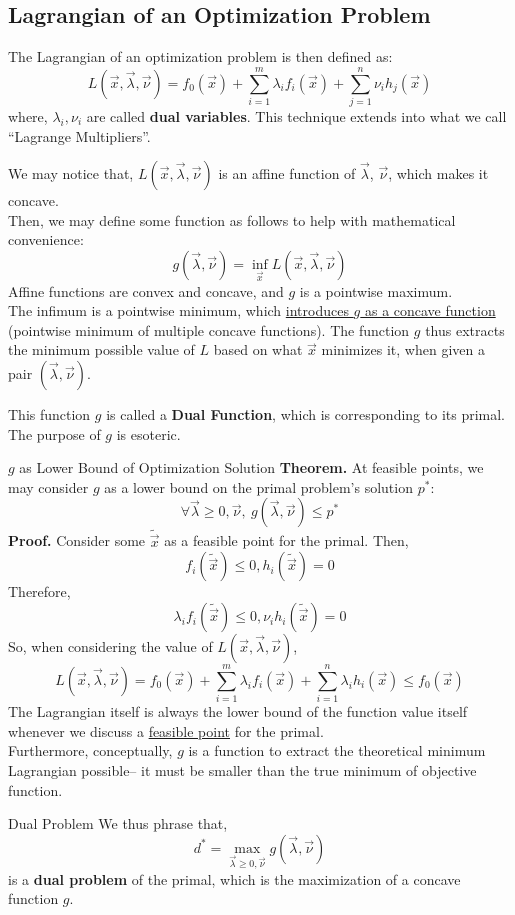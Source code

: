 \subsection{Lagrangian of an Optimization Problem}
The Lagrangian of an optimization problem is then defined as:
\[
    L(\vec{x}, \vec{\lambda}, \vec{\nu}) = f_0 (\vec{x}) + \sum_{i = 1}^m \lambda_i f_i (\vec{x}) + \sum_{j = 1}^n \nu_i h_j (\vec{x})
\]
where, $\lambda_i, \nu_i$ are called \textbf{dual variables}. This technique extends into what we call ``Lagrange Multipliers''.

We may notice that, $L(\vec{x}, \vec{\lambda}, \vec{\nu})$ is an affine function of $\vec{\lambda}$, $\vec{\nu}$, which makes it concave. \\
Then, we may define some function as follows to help with mathematical convenience:
\[
    g(\vec{\lambda}, \vec{\nu}) = \inf_{\vec{x}} L(\vec{x}, \vec{\lambda}, \vec{\nu})
\]
Affine functions are convex and concave, and $g$ is a pointwise maximum. \\
The infimum is a pointwise minimum, which \underline{introduces $g$ as a concave function} (pointwise minimum of multiple concave functions).
The function $g$ thus extracts the minimum possible value of $L$ based on what $\vec{x}$ minimizes it, when given a pair $(\vec{\lambda}, \vec{\nu})$.

This function $g$ is called a \textbf{Dual Function}, which is corresponding to its primal.
The purpose of $g$ is esoteric.
\begin{ln-theorem}{$g$ as Lower Bound of Optimization Solution}{}
    \textbf{Theorem.} At feasible points, we may consider $g$ as a lower bound on the primal problem's solution $p^*$:
    \[
        \forall \vec{\lambda} \geq 0, \vec{\nu},\ g(\vec{\lambda}, \vec{\nu}) \leq p^*
    \]
    \tcblower
    \textbf{Proof.}
    Consider some $\tilde{\vec{x}}$ as a feasible point for the primal.
    Then,
    \[
        f_i (\tilde{\vec{x}}) \leq 0, h_i (\tilde{\vec{x}}) = 0
    \]
    Therefore,
    \[
        \lambda_i f_i (\tilde{\vec{x}}) \leq 0, \nu_i h_i (\tilde{\vec{x}}) = 0
    \]
    So, when considering the value of $L(\vec{x}, \vec{\lambda}, \vec{\nu})$,
    \[
        L(\vec{x}, \vec{\lambda}, \vec{\nu}) = f_0 (\vec{x}) + \sum_{i = 1}^m \lambda_i f_i (\vec{x}) + \sum_{i = 1}^n \lambda_i h_i (\vec{x}) \leq f_0 (\vec{x})
    \]
    The Lagrangian itself is always the lower bound of the function value itself whenever we discuss a \underline{feasible point} for the primal. \\
    Furthermore, conceptually, $g$ is a function to extract the theoretical minimum Lagrangian possible-- it must be smaller than the true minimum of objective function.
\end{ln-theorem}

\begin{ln-define}{Dual Problem}{}
    We thus phrase that,
    \[
        d^* = \max_{
            \vec{\lambda} \geq 0, \vec{\nu}
        } g(\vec{\lambda}, \vec{\nu})
    \]
    is a \textbf{dual problem} of the primal, which is the maximization of a concave function $g$.
\end{ln-define}
